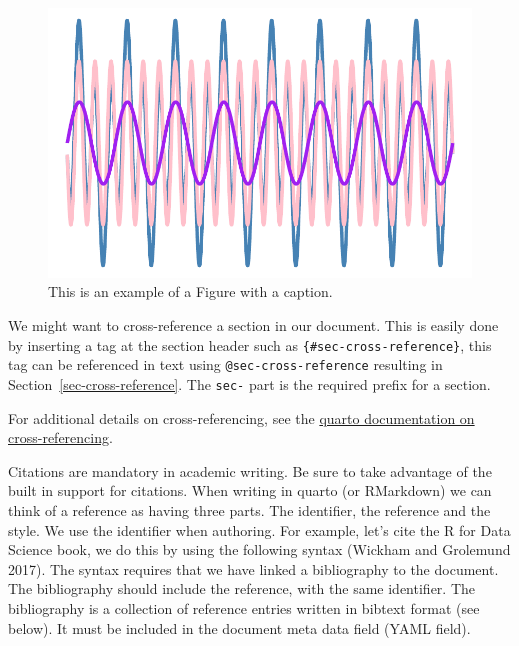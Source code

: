 \documentclass[
  11pt,
  letterpaper,
]{scrbook}
\begin{document}
\begin{figure}

{\centering \includegraphics{06-writing-reports_files/figure-pdf/fig-figure-example-1.pdf}

}

\caption{\label{fig-figure-example}This is an example of a Figure with a
caption.}

\end{figure}

We might want to cross-reference a section in our document. This is
easily done by inserting a tag at the section header such as
\texttt{\{\#sec-cross-reference\}}, this tag can be referenced in text
using \texttt{@sec-cross-reference} resulting in
Section~\ref{sec-cross-reference}. The \texttt{sec-} part is the
required prefix for a section.

For additional details on cross-referencing, see the
\href{https://quarto.org/docs/authoring/cross-references.html}{quarto
documentation on cross-referencing}.

Citations are mandatory in academic writing. Be sure to take advantage
of the built in support for citations. When writing in quarto (or
RMarkdown) we can think of a reference as having three parts. The
identifier, the reference and the style. We use the identifier when
authoring. For example, let's cite the R for Data Science book, we do
this by using the following syntax (Wickham and Grolemund 2017). The
syntax requires that we have linked a bibliography to the document. The
bibliography should include the reference, with the same identifier. The
bibliography is a collection of reference entries written in bibtext
format (see below). It must be included in the document meta data field
(YAML field).
\end{document}
